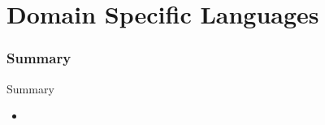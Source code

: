\part[DSLs]{Domain Specific Languages}



\section{Summary}
\begin{frame}{Summary}
\begin{itemize}
  \item
\end{itemize}
\end{frame}